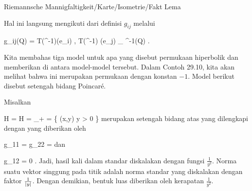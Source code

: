 {Riemannsche Mannigfaltigkeit/Karte/Isometrie/Fakt}
{Lema}
{}
{

\faktzusatz {}
\faktzusatz {}

}
{

Hal ini langsung mengikuti dari definisi $g_{ij}$ melalui

\mavergleichskettedisp
{\vergleichskette
{ g_{ij}(Q)
}
{ =} { \left\langle  T(\alpha^{-1})(e_i)  ,  T(\alpha^{-1}) (e_j)    \right\rangle_{ \alpha^{-1}(Q) }
}
{ } {
}
{ } {
}
{ } {
}
}
{}{}{.}

}


Kita membahas tiga model untuk apa yang disebut permukaan hiperbolik
 {} {}
dan memberikan
di antara model-model tersebut. Dalam
Contoh 29.10,
kita akan melihat bahwa ini merupakan permukaan dengan
konstan $-1$. Model berikut disebut setengah bidang Poincaré.

{

Misalkan

\mavergleichskettedisp
{\vergleichskette
{ H = {\mathbb H}
}
{ =} { \R \times \R_+
}
{ =} { \left\{ (x,y)  \mid   y > 0        \right\}
}
{ } {
}
{ } {
}
}
{}{}{}
merupakan setengah bidang atas yang dilengkapi dengan
yang diberikan oleh

\mavergleichskettedisp
{\vergleichskette
{ g_{11}
}
{ =} { g_{22}
}
{ =} { {  }
}
{ } {
}
{ } {
}
}
{}{}{}
dan

\mavergleichskette
{\vergleichskette
{ g_{12}
}
{ = }{ 0
}
{  }{
}
{    }{
}
{   }{
}
}
{}{}{.}
Jadi, hasil kali dalam standar diskalakan dengan fungsi ${ \frac{   1  }{  y^2 } }$. Norma suatu vektor singgung pada titik
 adalah norma standar yang diskalakan dengan faktor ${ \frac{   1  }{  \left|   y   \right| } }$. Dengan demikian, bentuk luas diberikan oleh kerapatan ${ \frac{   1  }{  y^2 } }$.

}

